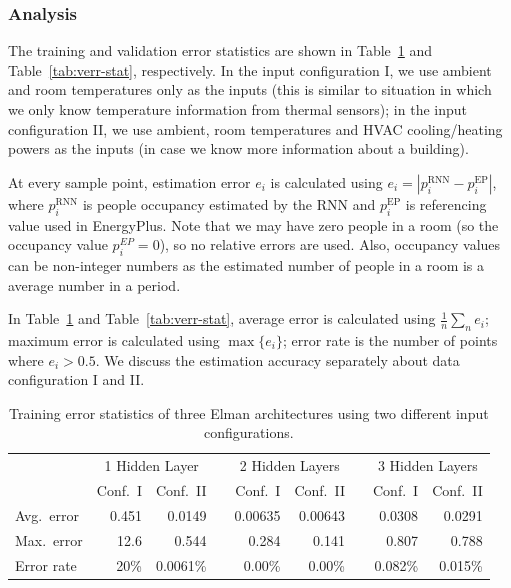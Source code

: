 \subsubsection{Analysis}
The training and validation error statistics are shown in
Table~\ref{tab:terr-stat} and Table~\ref{tab:verr-stat}, respectively.
In the input configuration I, we use ambient and room temperatures
only as the inputs (this is similar to situation in which we only know
temperature information from thermal sensors); in the input
configuration II, we use ambient, room temperatures and HVAC
cooling/heating powers as the inputs (in case we know more information
about a building).

At every sample point, estimation error $e_i$ is calculated using
$e_i=\left|p_i^{\text{RNN}}-p_i^{\text{EP}}\right|$, where
$p_i^{\text{RNN}}$ is people occupancy estimated by the RNN and
$p_i^{\text{EP}}$ is referencing value used in EnergyPlus. Note that we may
have zero people in a room (so the occupancy value $p_i^{EP} = 0$), so
no relative errors are used. Also, occupancy values can be
non-integer numbers as the estimated number of people in a room is a
average number in a period.

In Table~\ref{tab:terr-stat} and Table~\ref{tab:verr-stat}, average
error is calculated using $\frac1n\sum_ne_i$; maximum error is
calculated using $\max\{e_i\}$; error rate is the number of points
where $e_i>0.5$. We discuss the estimation accuracy separately about
data configuration I and II.

\begin{table}[t]
    \centering
    \begingroup
    \setlength{\tabcolsep}{3.6pt} %
    \begin{tabular}{lrrcrrcrr}
        \toprule
        & \multicolumn{2}{c}{1 Hidden Layer} && \multicolumn{2}{c}{2 Hidden Layers} && \multicolumn{2}{c}{3 Hidden Layers}\\
        \cmidrule{2-3} \cmidrule{5-6} \cmidrule{8-9}
        & Conf.~I & Conf.~II && Conf.~I & Conf.~II && Conf.~I & Conf.~II\\
        \midrule
        Avg.~error & 0.451      & 0.0149    && 0.00635   & 0.00643   && 0.0308      & 0.0291    \\
        Max.~error & 12.6       & 0.544     && 0.284     & 0.141     && 0.807       & 0.788     \\
        Error rate & 20\%       & 0.0061\%  && 0.00\%    & 0.00\%    && 0.082\%     & 0.015\%   \\
        \bottomrule
    \end{tabular}
    \endgroup
    \caption{Training error statistics of three Elman architectures using two
        different input configurations.}
    \label{tab:terr-stat}
\end{table}


